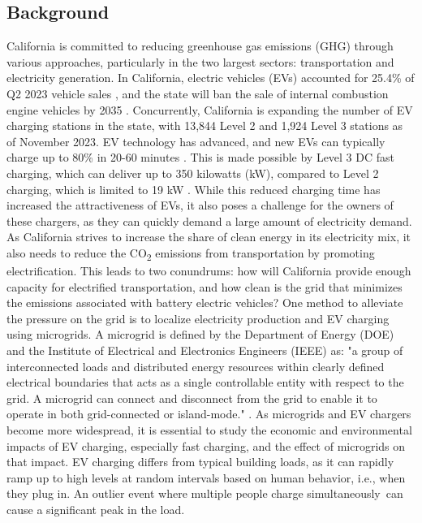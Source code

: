 \documentclass[conference, usletter]{IEEEtran}
\begin{document}
\subsection{Background}
California is committed to reducing greenhouse gas emissions (GHG) through various approaches, particularly in the two largest sectors: transportation and electricity generation. In California, electric vehicles (EVs) accounted for 25.4\% of Q2 2023 vehicle sales \cite{ev_sale_percentage}, and the state will ban the sale of internal combustion engine vehicles by 2035 \cite{ice_ban}. Concurrently, California is expanding the number of EV charging stations in the state, with 13,844 Level 2 and 1,924 Level 3 stations \cite{ev_stations_CA} as of November 2023. EV technology has advanced, and new EVs can typically charge up to 80\% in 20-60 minutes \cite{ev_stats}. This is made possible by Level 3 DC fast charging, which can deliver up to 350 kilowatts (kW), compared to Level 2 charging, which is limited to 19 kW \cite{ev_stats}. While this reduced charging time has increased the attractiveness of EVs, it also poses a challenge for the owners of these chargers, as they can quickly demand a large amount of electricity demand. As California strives to increase the share of clean energy in its electricity mix, it also needs to reduce the CO\textsubscript{2} emissions from transportation by promoting electrification. This leads to two conundrums: how will California provide enough capacity for electrified transportation, and how clean is the grid that minimizes the emissions associated with battery electric vehicles? One method to alleviate the pressure on the grid is to localize electricity production and EV charging using microgrids. A microgrid is defined by the Department of Energy (DOE) and the Institute of Electrical and Electronics Engineers (IEEE) as: "a group of interconnected loads and distributed energy resources within clearly defined electrical boundaries that acts as a single controllable entity with respect to the grid. A microgrid can connect and disconnect from the grid to enable it to operate in both grid-connected or island-mode." \cite{microgrid_def} \cite{microgrid_def_ieee}. As microgrids and EV chargers become more widespread, it is essential to study the economic and environmental impacts of EV charging, especially fast charging, and the effect of microgrids on that impact. EV charging differs from typical building loads, as it can rapidly ramp up to high levels at random intervals based on human behavior, i.e., when they plug in. An outlier event where multiple people charge simultaneously can cause a significant peak in the load. 
\end{document}
